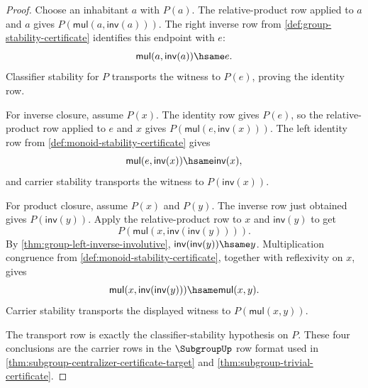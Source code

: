 \begin{proof}
Choose an inhabitant $a$ with $P(a)$. The relative-product row applied to $a$ and $a$ gives $P(\mathsf{mul}(a,\mathsf{inv}(a)))$. The right inverse row from \autoref{def:group-stability-certificate} identifies this endpoint with $e$:
$$
\mathsf{mul}(a,\mathsf{inv}(a))\hsame e.
$$
Classifier stability for $P$ transports the witness to $P(e)$, proving the identity row.

For inverse closure, assume $P(x)$. The identity row gives $P(e)$, so the relative-product row applied to $e$ and $x$ gives $P(\mathsf{mul}(e,\mathsf{inv}(x)))$. The left identity row from \autoref{def:monoid-stability-certificate} gives
$$
\mathsf{mul}(e,\mathsf{inv}(x))\hsame\mathsf{inv}(x),
$$
and carrier stability transports the witness to $P(\mathsf{inv}(x))$.

For product closure, assume $P(x)$ and $P(y)$. The inverse row just obtained gives $P(\mathsf{inv}(y))$. Apply the relative-product row to $x$ and $\mathsf{inv}(y)$ to get
$$
P(\mathsf{mul}(x,\mathsf{inv}(\mathsf{inv}(y)))).
$$
By \autoref{thm:group-left-inverse-involutive}, $\mathsf{inv}(\mathsf{inv}(y))\hsame y$. Multiplication congruence from \autoref{def:monoid-stability-certificate}, together with reflexivity on $x$, gives
$$
\mathsf{mul}(x,\mathsf{inv}(\mathsf{inv}(y)))\hsame\mathsf{mul}(x,y).
$$
Carrier stability transports the displayed witness to $P(\mathsf{mul}(x,y))$.

The transport row is exactly the classifier-stability hypothesis on $P$. These four conclusions are the carrier rows in the $\SubgroupUp$ row format used in \autoref{thm:subgroup-centralizer-certificate-target} and \autoref{thm:subgroup-trivial-certificate}.
\end{proof}

